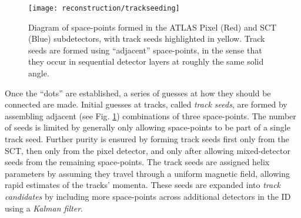             \begin{figure}[tbh]
                \texttt{[image: reconstruction/trackseeding]}
                \caption{
                    Diagram of space-points formed in the ATLAS Pixel (Red) and SCT (Blue) subdetectors,
                        with track seeds highlighted in yellow\cite{track_seeding}.
                    Track seeds are formed using ``adjacent'' space-points, in the sense that they
                        occur in sequential detector layers at roughly the same solid angle.
                }
                \label{fig:track_fit}
            \end{figure}

            Once the ``dots'' are established, a series of guesses at how they should be connected are made.
            Initial guesses at tracks, called \textit{track seeds},
                are formed by assembling adjacent (see Fig. \ref{fig:track_fit}) combinations of three space-points.
            The number of seeds is limited by generally only allowing space-points to be part of a single track seed.
            Further purity is ensured by forming track seeds first only from the SCT, then only from the pixel detector,
                and only after allowing mixed-detector seeds from the remaining space-points.
            The track seeds are assigned helix parameters by assuming they travel through a uniform magnetic field,
                allowing rapid estimates of the tracks' momenta.
            These seeds are expanded into \textit{track candidates}
                by including more space-points across additional detectors in the ID using a \textit{Kalman filter}.

